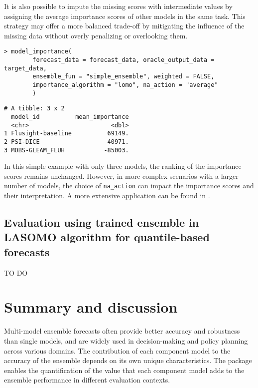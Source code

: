 \documentclass[
  article,
  shortnames,
  notitle]{jss}
\begin{document}
It is also possible to impute the missing scores with intermediate
values by assigning the average importance scores of other models in the
same task. This strategy may offer a more balanced trade-off by
mitigating the influence of the missing data without overly penalizing
or overlooking them.

\begin{verbatim}
> model_importance(
        forecast_data = forecast_data, oracle_output_data = target_data,
        ensemble_fun = "simple_ensemble", weighted = FALSE,
        importance_algorithm = "lomo", na_action = "average"
        )
\end{verbatim}

\small

\begin{verbatim}
# A tibble: 3 x 2
  model_id          mean_importance
  <chr>                       <dbl>
1 Flusight-baseline          69149.
2 PSI-DICE                   40971.
3 MOBS-GLEAM_FLUH           -85003.
\end{verbatim}

\normalsize

In this simple example with only three models, the ranking of the
importance scores remains unchanged. However, in more complex scenarios
with a larger number of models, the choice of \texttt{na\_action} can
impact the importance scores and their interpretation. A more extensive
application can be found in \citet{kim2024}.

\subsection{Evaluation using trained ensemble in LASOMO algorithm for
quantile-based forecasts}\label{sec:trained-lomo-qntl}

TO DO

\section{Summary and discussion}\label{sec:discussion}

Multi-model ensemble forecasts often provide better accuracy and
robustness than single models, and are widely used in decision-making
and policy planning across various domains. The contribution of each
component model to the accuracy of the ensemble depends on its own
unique characteristics. The  package enables the
quantification of the value that each component model adds to the
ensemble performance in different evaluation contexts.
\end{document}
